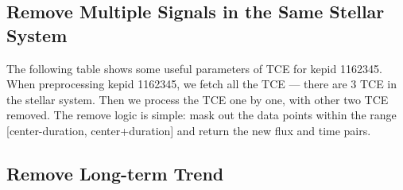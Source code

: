     \subsection{Remove Multiple Signals in the Same Stellar System}
      The following table shows some useful parameters of TCE for kepid 1162345. 
      When preprocessing kepid 1162345, we fetch all the TCE --- there are 3 TCE in the stellar 
      system. Then we process the TCE one by one, with other two TCE removed. The remove logic is simple:
      mask out the data points within the range [center-duration, center+duration] and return the new 
      flux and time pairs. 

      \begin{table}[!htp]
        \centering
        \centering
        \caption[Parameters of three TCE for kepid 1162345.]
          {Parameters of three TCE for kepid 1162345. When processing the TCE for planet 2, we remove the signals for 
          planet 1 and 3.}
        \label{table: params_1162345}
      \end{table}
    
    \subsection{Remove Long-term Trend}
      